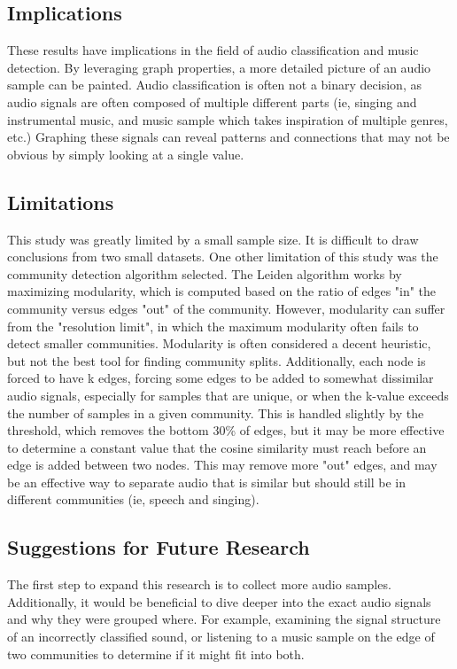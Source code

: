\documentclass{article}
\begin{document}
\subsection{Implications}
These results have implications in the field of audio classification and music detection. By leveraging graph properties, a more detailed picture of an audio sample can be painted. Audio classification is often not a binary decision, as audio signals are often composed of multiple different parts (ie, singing and instrumental music, and music sample which takes inspiration of multiple genres, etc.) Graphing these signals can reveal patterns and connections that may not be obvious by simply looking at a single value.

\subsection{Limitations}
This study was greatly limited by a small sample size. It is difficult to draw conclusions from two small datasets. One other limitation of this study was the community detection algorithm selected. The Leiden algorithm works by maximizing modularity, which is computed based on the ratio of edges "in" the community versus edges "out" of the community. However, modularity can suffer from the "resolution limit", in which the maximum modularity often fails to detect smaller communities. Modularity is often considered a decent heuristic, but not the best tool for finding community splits. Additionally, each node is forced to have k edges, forcing some edges to be added to somewhat dissimilar audio signals, especially for samples that are
unique, or when the k-value exceeds the number of samples in a given community. This is handled slightly by the threshold, which removes the bottom 30\% of edges, but it may be more effective to determine a constant value that the cosine similarity must reach before an edge is added between two nodes. This may remove more
"out" edges, and may be an effective way to separate audio that is similar but should still be in different communities (ie, speech and singing).

\subsection{Suggestions for Future Research}
The first step to expand this research is to collect more audio samples. Additionally, it would be beneficial to dive deeper into the exact audio signals and why they were grouped where. For example, examining the signal structure of an incorrectly classified sound, or listening to a music sample on the edge of two communities to determine if it might fit into both.
\end{document}
